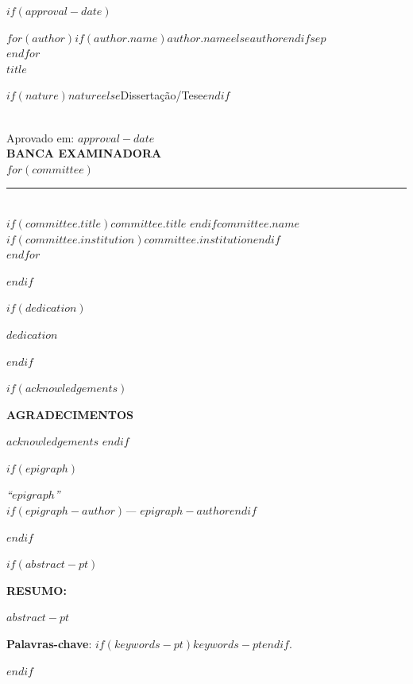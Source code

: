 \documentclass[
  12pt,
  oneside,
  a4paper,
  chapter=TITLE,
  english,
  portuguese
]{abntex2}
\renewcommand{\ABNTEXchapterfont}{\bfseries}
\begin{document}
$if(approval-date)$
\newpage
\thispagestyle{empty}
\begin{center}
  {\ABNTEXchapterfont\bfseries\large
    $for(author)$$if(author.name)$\MakeUppercase{$author.name$}$else$\MakeUppercase{$author$}$endif$$sep$\\$endfor$
  }\\[1cm]
  {\ABNTEXchapterfont\bfseries\large \MakeUppercase{$title$}}\\[1cm]
  \hspace*{8cm}\parbox{8cm}{\normalsize\normalfont
    $if(nature)$$nature$$else$Dissertação/Tese$endif$
  }\\[1cm]
  Aprovado em: $approval-date$\\[2cm]
  {\bfseries BANCA EXAMINADORA}\\[1.5cm]
  $for(committee)$
  \rule{8cm}{0.4pt}\\
  $if(committee.title)$$committee.title$ $endif$$committee.name$\\
  $if(committee.institution)$$committee.institution$$endif$\\[1.5cm]
  $endfor$
\end{center}
$endif$

$if(dedication)$
\newpage
\thispagestyle{empty}
\vspace*{\fill}
\hspace*{8cm}\parbox{8cm}{\normalfont\itshape $dedication$}
$endif$

$if(acknowledgements)$
\newpage
\thispagestyle{empty}
\begin{center}{\ABNTEXchapterfont\bfseries\normalsize AGRADECIMENTOS}\end{center}
\vspace{\onelineskip}
$acknowledgements$
\clearpage
$endif$

$if(epigraph)$
\newpage
\thispagestyle{empty}
\vspace*{\fill}
\hspace*{8cm}\parbox{8cm}{\normalfont\itshape
  ``$epigraph$''\\
  $if(epigraph-author)$\hfill --- $epigraph-author$$endif$
}
$endif$

$if(abstract-pt)$
\newpage
\thispagestyle{empty}
\begin{resumoumacoluna}
\noindent\textbf{RESUMO:}\vspace{\onelineskip}

$abstract-pt$

\vspace{\onelineskip}
\noindent\textbf{Palavras-chave}: $if(keywords-pt)$$keywords-pt$$endif$.
\end{resumoumacoluna}
\clearpage
$endif$
\end{document}
